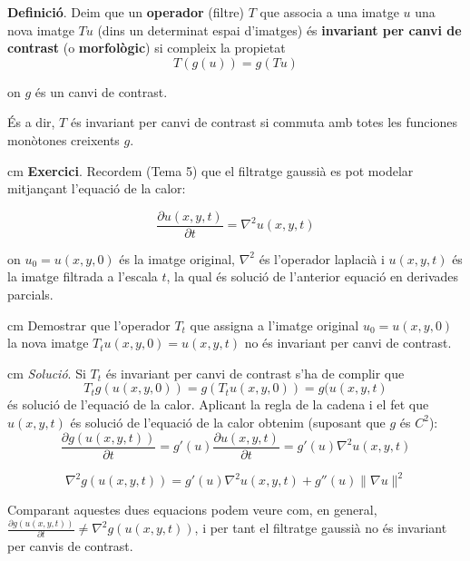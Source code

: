 \documentclass{article}
\begin{document}
\noindent
{\bf Definici\'o}. Deim que un {\bf operador} (filtre) $T$ que associa a una imatge $u$ una nova imatge $Tu$ (dins
un determinat espai d'imatges) \'es {\bf invariant per canvi de contrast} (o {\bf morfol\`ogic}) si compleix la propietat
\begin{equation}
\label{prop_inv_contrast}
T(g(u))=g(Tu)
\end{equation}

\noindent
on $g$ \'es un canvi de contrast.

\noindent
\'Es a dir, $T$ \'es invariant per canvi de contrast si commuta amb totes les funciones mon\`otones creixents $g$.

 cm
\noindent
{\bf Exercici}. Recordem (Tema 5) que el filtratge gaussi\`a es pot modelar 
mitjan\c{c}ant l'equaci\'o de la calor:

\[
\frac{\partial u(x, y, t)}{\partial t} = \nabla^2 u(x, y, t) 
\]

\noindent
on $u_0=u(x, y, 0)$ \'es la imatge original, $\nabla^2$ \'es l'operador laplaci\`a i 
$u(x, y, t)$ \'es la imatge filtrada a 
l'escala $t$, la qual \'es soluci\'o de l'anterior equaci\'o en derivades parcials.

 cm
\noindent
Demostrar que l'operador $T_t$ que assigna a l'imatge original $u_0=u(x, y, 0)$ 
la nova imatge $T_t u(x, y, 0)=u(x, y, t)$ no \'es invariant per canvi de contrast.

 cm
\noindent
{\it Soluci\'o}. Si $T_t$ \'es invariant per canvi de contrast s'ha de complir que 
\[
T_t g(u(x, y, 0))=g(T_t u(x, y, 0))=g(u(x, y, t)
\]
\noindent
\'es soluci\'o de l'equaci\'o de la calor.
Aplicant la regla de la cadena i el fet que $u(x, y, t)$ \'es soluci\'o de l'equaci\'o de la calor 
obtenim (suposant que $g$ \'es $C^2$):
\begin{equation}
\label{exgauss1}
\frac{\partial g(u(x, y, t))}{\partial t}=g'(u) \frac{\partial u(x, y, t)}{\partial t}=g'(u) \nabla^2 u(x, y, t) 
\end{equation}

\begin{equation}
\label{exgauss2}
\nabla^2 g(u(x, y, t)) = g'(u) \nabla^2 u(x, y, t) + g''(u) \|\nabla u\|^2
\end{equation}

\noindent
Comparant aquestes dues equacions podem veure com, en general, 
$\frac{\partial g(u(x, y, t))}{\partial t} \neq \nabla^2 g(u(x, y, t))$, i per tant el filtratge gaussi\`a
no \'es invariant per canvis de contrast.
\end{document}
